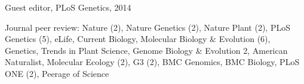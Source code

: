 \documentclass[letterpaper]{article}
\newcommand{\ignore}[1]{}
\renewenvironment{itemize}{
  \begin{list}{}{
    \setlength{\leftmargin}{1.5em}
  }
}{
  \end{list}
}
\begin{document}
\begin{itemize}
\item Guest editor, PLoS Genetics, 2014 %
\item Journal peer review: \ignore{10/13,7/15} Nature (2), \ignore{1/14, 3/14} Nature Genetics (2), \ignore{6/15,7/15}  Nature Plant (2), \ignore{4/14,4/14,8/14,12/14,5/15} PLoS Genetics (5), \ignore{1/15} eLife, \ignore{9/15} Current Biology, \ignore{9/15,7/14,7/14,5/15,6/15,7/15} Molecular Biology \& Evolution (6), \ignore{7/15} Genetics, \ignore{9/2015} Trends in Plant Science, \ignore{12/14,6/15} Genome Biology \& Evolution {2}, \ignore {3/14} American Naturalist, \ignore{1/14,1/15} Molecular Ecology (2), \ignore{2/15,6/15} G3 (2), \ignore{1/14} BMC Genomics, \ignore{10/14} BMC Biology, \ignore{1/15,6/15} PLoS ONE (2), \ignore{9/13} Peerage of Science
\end{itemize}
\end{document}
